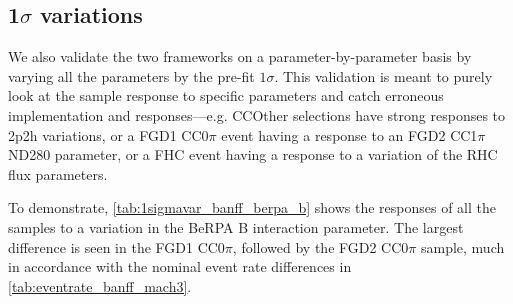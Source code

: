\subsection{1$\sigma$ variations}
We also validate the two frameworks on a parameter-by-parameter basis by varying all the parameters by the pre-fit $1\sigma$. This validation is meant to purely look at the sample response to specific parameters and catch erroneous implementation and \pmu \cosmu responses---e.g. CCOther selections have strong responses to 2p2h variations, or a FGD1 CC0$\pi$ event having a response to an FGD2 CC1$\pi$ ND280 parameter, or a FHC \numu event having a response to a variation of the RHC flux parameters.

To demonstrate, \autoref{tab:1sigmavar_banff_berpa_b} shows the responses of all the samples to a variation in the BeRPA B interaction parameter. The largest difference is seen in the FGD1 CC0$\pi$, followed by the FGD2 CC0$\pi$ sample, much in accordance with the nominal event rate differences in \autoref{tab:eventrate_banff_mach3}.
